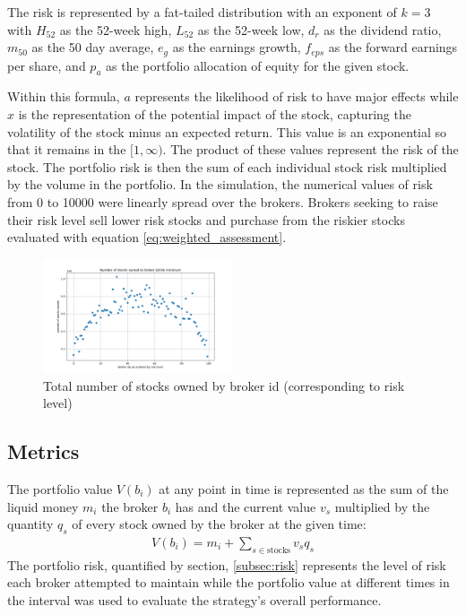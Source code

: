 \documentclass[letterpaper, 11 pt, proceedings]{IEEEtran}
\begin{document}
	The risk is represented by a fat-tailed distribution with an exponent of $k=3$ with $H_{52}$ as the 52-week high, $L_{52}$ as the 52-week low, $d_r$ as the dividend ratio, $m_{50}$ as the 50 day average, $e_g$ as the earnings growth, $f_{eps}$ as the forward earnings per share, and $p_a$ as the portfolio allocation of equity for the given stock. 
	
	Within this formula, $a$ represents the likelihood of risk to have major effects while $x$ is the representation of the potential impact of the stock, capturing the volatility of the stock minus an expected return. This value is an exponential so that it remains in the $[1, \infty)$.
	The product of these values represent the risk of the stock. The portfolio risk is then the sum of each individual stock risk multiplied by the volume in the portfolio. In the simulation, the numerical values of risk from 0 to 10000 were linearly spread over the brokers. Brokers seeking to raise their risk level sell lower risk stocks and purchase from the riskier stocks evaluated with equation \ref{eq:weighted_assessment}.

	\begin{figure}[h]
		\centering
		\includegraphics[width=0.5\textwidth]{stocksOwnedToBrokerIds.png}
		\caption{Total number of stocks owned by broker id (corresponding to risk level)}
		\label{totalvID}
	\end{figure}
	
		
	\subsection{Metrics}\label{subsec:metrics}	
	The portfolio value $V(b_i)$ at any point in time is represented as the sum of the liquid money $m_i$ the broker $b_i$ has and the current value $v_s$ multiplied by the quantity $q_s$ of every stock owned by the broker at the given time: 
	\begin{align}
		V(b_i) = m_i + \sum\limits_{s\in\text{stocks}} v_s q_s\label{eq:portfolio_value}
	\end{align}
	The portfolio risk, quantified by section, \ref{subsec:risk} represents the level of risk each broker attempted to maintain while the portfolio value at different times in the interval was used to evaluate the strategy's overall performance.
\end{document}
